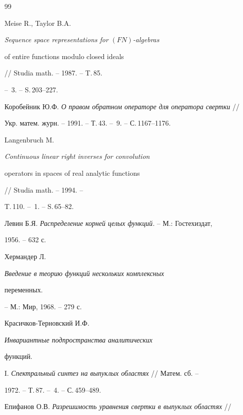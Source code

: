 \begin{thebibliography}{99}
 




Meise R., Taylor B.A. {\em Sequence space representations for $(FN)$-algebras 


of entire functions modulo closed ideals} // Studia math. -- 1987. -- T.\,85. 


-- \No\,3. -- S.\,203--227. 


 




Коробейник Ю.Ф. {\em О правом обратном операторе для оператора свертки} // 


Укр. матем. журн. -- 1991. -- Т.\,43. -- \No\,9. -- С.\,1167--1176. 


 




Langenbruch M. {\em Continuous linear right inverses for convolution 


operators in spaces of real analytic functions} // Studia math. -- 1994. -- 


T.\,110. -- \No\,1. -- S.\,65--82. 


 




Левин Б.Я. {\em Распределение корней целых функций.} -- М.: Гостехиздат, 


1956. -- 632 с. 


 




Хермандер Л. {\em Введение в теорию функций нескольких комплексных 


переменных.} -- М.: Мир, 1968. -- 279 с. 


 




Красичков-Терновский И.Ф. {\em Инвариантные подпространства аналитических 


функций.} I. {\em Спектральный синтез на выпуклых областях} // Матем. сб. -- 


1972. -- Т.\,87. -- \No\,4. -- С.\,459--489. 


 




Епифанов О.В. {\em Разрешимость уравнения свертки в выпуклых областях} // 



\end{thebibliography}
